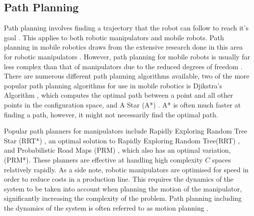 \subsection{Path Planning} \label{sec:T:RC:PathPlanning}
Path planning involves finding a trajectory that the robot can follow to reach it's goal \cite{SiegwartRoland2011Itam}. This applies to both robotic manipulators and mobile robots. Path planning in mobile robotics draws from the extensive research done in this area for robotic manipulators \cite{SiegwartRoland2011Itam}. However, path planning for mobile robots is usually far less complex than that of manipulators due to the reduced degrees of freedom \cite{SiegwartRoland2011Itam}. There are numerous different path planning algorithms available, two of the more popular path planning algorithms for use in mobile robotics is Djikstra's Algorithm \cite{DijkstraE.W1959Anot}, which computes the optimal path between a point and all other points in the configuration space, and A Star (A*) \cite{HartNilsson1968}. A* is often much faster at finding a path, however, it might not necessarily find the optimal path.

Popular path planners for manipulators include Rapidly Exploring Random Tree Star (RRT*) \cite{KaramanSertac2011Safo}, an optimal solution to Rapidly Exploring Random Tree(RRT) \cite{LaValleStevenM.2001RKP}, and Probabilistic Road Maps (PRM) \cite{KavrakiL.E.1996Prfp}, which also has an optimal variation, (PRM*)\cite{KavrakiL.E.1996Prfp}. These planners are effective at handling high complexity $C$ spaces relatively rapidly\cite{LynchKevin2017Mr:m}. As a side note, robotic manipulators are optimised for speed in order to reduce costs in a production line. This requires the dynamics of the system to be taken into account when planning the motion of the manipulator, significantly increasing the complexity of the problem. Path planning including the dynamics of the system is often referred to as motion planning \cite{LynchKevin2017Mr:m}.

